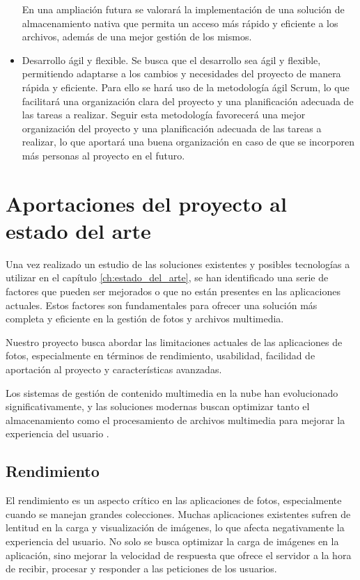 \begin{itemize}
        En una ampliación futura se valorará la implementación de una solución de almacenamiento nativa que permita un acceso más rápido y eficiente a los archivos, además de una mejor gestión de los mismos.
    \item Desarrollo ágil y flexible. Se busca que el desarrollo sea ágil y flexible, permitiendo adaptarse a los cambios y necesidades del proyecto de manera rápida y eficiente. Para ello se hará uso de la metodología ágil Scrum, lo que facilitará una organización clara del proyecto y una planificación adecuada de las tareas a realizar.
        Seguir esta metodología favorecerá una mejor organización del proyecto y una planificación adecuada de las tareas a realizar, lo que aportará una buena organización en caso de que se incorporen más personas al proyecto en el futuro.
\end{itemize}

\section{Aportaciones del proyecto al estado del arte}
Una vez realizado un estudio de las soluciones existentes y posibles tecnologías a utilizar en el capítulo \ref{ch:estado_del_arte}, se han identificado una serie de factores que pueden ser mejorados o que no están presentes en las aplicaciones actuales. Estos factores son fundamentales para ofrecer una solución más completa y eficiente en la gestión de fotos y archivos multimedia.

Nuestro proyecto busca abordar las limitaciones actuales de las aplicaciones de fotos, especialmente en términos de rendimiento, usabilidad, facilidad de aportación al proyecto y características avanzadas.

Los sistemas de gestión de contenido multimedia en la nube han evolucionado significativamente, y las soluciones modernas buscan optimizar tanto el almacenamiento como el procesamiento de archivos multimedia para mejorar la experiencia del usuario \parencite{diaz2011mediacloud}.

\subsection{Rendimiento}
El rendimiento es un aspecto crítico en las aplicaciones de fotos, especialmente cuando se manejan grandes colecciones. Muchas aplicaciones existentes sufren de lentitud en la carga y visualización de imágenes, lo que afecta negativamente la experiencia del usuario.
No solo se busca optimizar la carga de imágenes en la aplicación, sino mejorar la velocidad de respuesta que ofrece el servidor a la hora de recibir, procesar y responder a las peticiones de los usuarios.

